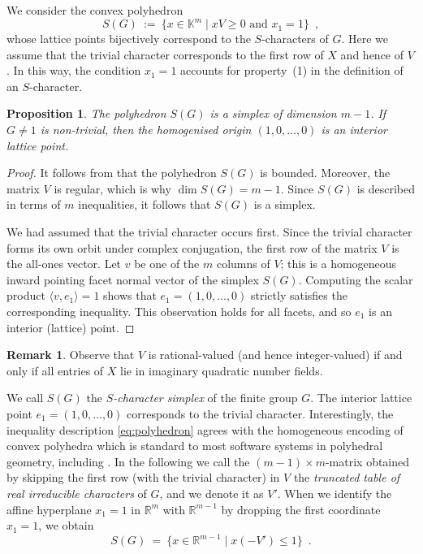 \documentclass[12pt,leqno,a4paper]{amsart}
\newcommand{\KK}{{\mathbb{K}}}
\newcommand{\RR}{{\mathbb{R}}}
\newcommand{\polymake}{{\sf{polymake}}\xspace}
\newtheorem{prop}[thm]{Proposition}
\theoremstyle{definition}
\newtheorem{rem}[thm]{Remark}
\begin{document}
We consider the convex polyhedron
\begin{equation}\label{eq:polyhedron}
  S(G)\ := \ \bigl\{ x\in \KK^m \mid x V\geq0 \text{ and } x_1=1 \bigr\} \enspace,
\end{equation}
whose lattice points bijectively correspond to the $S$-characters of $G$.
Here we assume that the trivial character corresponds to the first row of $X$
and hence of $V$. In this way, the condition $x_1=1$ accounts for property~(1)
in the definition of an $S$-character.

\begin{prop}   \label{prop:simplex}
  The polyhedron $S(G)$ is a simplex of dimension $m-1$.
  If $G\neq 1$ is non-trivial, then the homogenised origin $(1,0,\ldots,0)$ is an
  interior lattice point.
\end{prop}

\begin{proof}
  It follows from \cite[Lemma~2]{Zh} that the polyhedron $S(G)$ is bounded.
  Moreover, the matrix $V$ is regular, which is why $\dim S(G)=m-1$.
  Since $S(G)$ is described in terms of $m$ inequalities, it follows that $S(G)$
  is a simplex.

  We had assumed that the trivial character occurs first.
  Since the trivial character forms its own orbit under complex conjugation,
  the first row of the matrix $V$ is the all-ones vector.
  Let $v$ be one of the $m$ columns of $V$; this is a homogeneous inward pointing
  facet normal vector of the simplex $S(G)$.
  Computing the scalar product $\langle v, e_1\rangle=1$ shows that
  $e_1=(1,0,\ldots,0)$ strictly satisfies the corresponding inequality.
  This observation holds for all facets, and so $e_1$ is an interior (lattice)
  point.
\end{proof}

\begin{rem}
  Observe that $V$ is rational-valued (and hence integer-valued) if and only if
  all entries of $X$ lie in imaginary quadratic number fields.
\end{rem}

We call $S(G)$ the \emph{$S$-character simplex} of the finite group $G$.
The interior lattice point $e_1=(1,0,\ldots,0)$ corresponds to the trivial character.
Interestingly, the inequality description \eqref{eq:polyhedron} agrees with the
homogeneous encoding of convex polyhedra which is standard to most software
systems in polyhedral geometry, including \polymake \cite{polymake-lattice}.
In the following we call the $(m{-}1)\times m$-matrix obtained by skipping the
first row (with the trivial character) in $V$ the \emph{truncated table of real
irreducible characters} of $G$, and we denote it as $V'$.
When we identify the affine hyperplane $x_1=1$ in $\RR^m$ with $\RR^{m-1}$ by
dropping the first coordinate $x_1=1$, we obtain
\begin{equation}  \label{eq:ineq}
  S(G) \ = \ \bigl\{ x \in \RR^{m-1} \mid x (-V') \leq 1 \} \enspace .
\end{equation}
\end{document}
